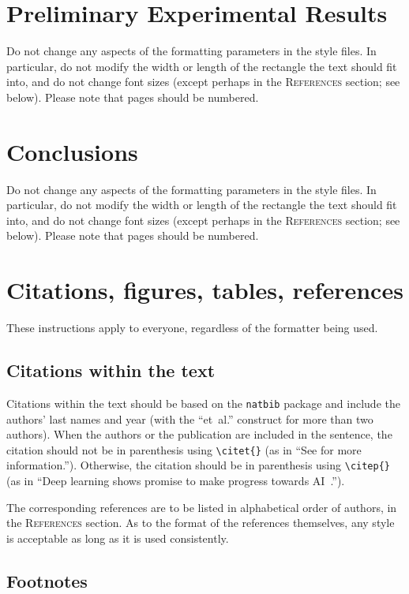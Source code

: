 \documentclass{article} %
\begin{document}
\section{Preliminary Experimental Results}
\label{res}
Do not change any aspects of the formatting parameters in the style files.
In particular, do not modify the width or length of the rectangle the text
should fit into, and do not change font sizes (except perhaps in the
\textsc{References} section; see below). Please note that pages should be
numbered.

\section{Conclusions}
\label{conclue}
Do not change any aspects of the formatting parameters in the style files.
In particular, do not modify the width or length of the rectangle the text
should fit into, and do not change font sizes (except perhaps in the
\textsc{References} section; see below). Please note that pages should be
numbered.

\section{Citations, figures, tables, references}
\label{others}

These instructions apply to everyone, regardless of the formatter being used.

\subsection{Citations within the text}

Citations within the text should be based on the \texttt{natbib} package
and include the authors' last names and year (with the ``et~al.'' construct
for more than two authors). When the authors or the publication are
included in the sentence, the citation should not be in parenthesis using \verb|\citet{}| (as
in ``See \citet{Hinton06} for more information.''). Otherwise, the citation
should be in parenthesis using \verb|\citep{}| (as in ``Deep learning shows promise to make progress
towards AI~\citep{Bengio+chapter2007}.'').

The corresponding references are to be listed in alphabetical order of
authors, in the \textsc{References} section. As to the format of the
references themselves, any style is acceptable as long as it is used
consistently.

\subsection{Footnotes}
\end{document}
